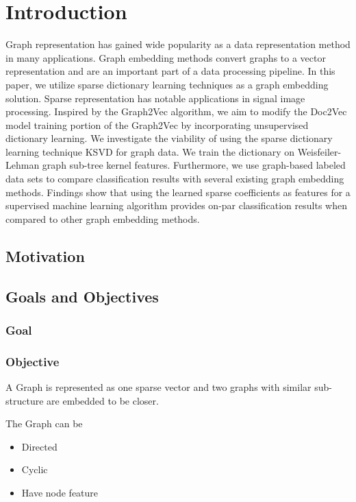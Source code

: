 \chapter{Introduction}\label{ch:introduction}


Graph representation has gained wide popularity as a data representation method in many applications. Graph embedding methods convert graphs to a vector representation and are an important part of a data processing pipeline. In this paper, we utilize sparse dictionary learning techniques as a graph embedding solution. Sparse representation has notable applications in signal image processing. Inspired by the Graph2Vec algorithm, we aim to modify the Doc2Vec model training portion of the Graph2Vec by incorporating unsupervised dictionary learning. We investigate the viability of using the sparse dictionary learning technique KSVD for graph data. We train the dictionary on Weisfeiler-Lehman graph sub-tree kernel features. Furthermore, we use graph-based labeled data sets to compare classification results with several existing graph embedding methods. Findings show that using the learned sparse coefficients as features for a supervised machine learning algorithm provides on-par classification results when compared to other graph embedding methods. 

\section{Motivation}

\section{Goals and Objectives}

\subsection{Goal}

\subsection{Objective}
A Graph is represented as one sparse vector and two graphs with similar sub- structure are embedded to be closer.

The Graph can be
\begin{itemize}
    \item Directed
    \item Cyclic
    \item Have node feature
\end{itemize}

